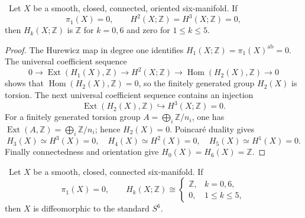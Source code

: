 \begin{lemma}
\label{lem:cohomological-closure}
\Verified\ Let $X$ be a smooth, closed, connected, oriented six-manifold.
If
\[
\pi_1(X)=0,
\qquad H^2(X;\mathbb Z)=H^3(X;\mathbb Z)=0,
\tag{4.4}
\]
then $H_k(X;\mathbb Z)$ is $\mathbb Z$ for $k=0,6$ and zero for
$1\le k\le5$.
\end{lemma}

\begin{proof}
The Hurewicz map in degree one identifies
$H_1(X;\mathbb Z)=\pi_1(X)^{\mathrm{ab}}=0$.  The universal coefficient
sequence
\[
0\longrightarrow\operatorname{Ext}(H_1(X),\mathbb Z)
\longrightarrow H^2(X;\mathbb Z)
\longrightarrow\operatorname{Hom}(H_2(X),\mathbb Z)
\longrightarrow0
\]
shows that $\operatorname{Hom}(H_2(X),\mathbb Z)=0$, so the finitely
generated group $H_2(X)$ is torsion.  The next universal coefficient
sequence contains an injection
\[
\operatorname{Ext}(H_2(X),\mathbb Z)
\hookrightarrow H^3(X;\mathbb Z)=0.
\]
For a finitely generated torsion group
$A=\bigoplus_i\mathbb Z/n_i$, one has
$\operatorname{Ext}(A,\mathbb Z)=\bigoplus_i\mathbb Z/n_i$; hence
$H_2(X)=0$.  Poincar\'e duality gives
\[
H_3(X)\simeq H^3(X)=0,\quad
H_4(X)\simeq H^2(X)=0,\quad
H_5(X)\simeq H^1(X)=0.
\]
Finally connectedness and orientation give $H_0(X)=H_6(X)=\mathbb Z$.
\end{proof}

\begin{theorem}
\label{thm:sphere-recognition}
\Verified\ Let $X$ be a smooth, closed, connected six-manifold.  If
\[
\pi_1(X)=0,\qquad
H_k(X;\mathbb Z)\cong
\begin{cases}
\mathbb Z,&k=0,6,\\
0,&1\le k\le5,
\end{cases}
\tag{4.5}
\]
then $X$ is diffeomorphic to the standard $S^6$.
\end{theorem}

